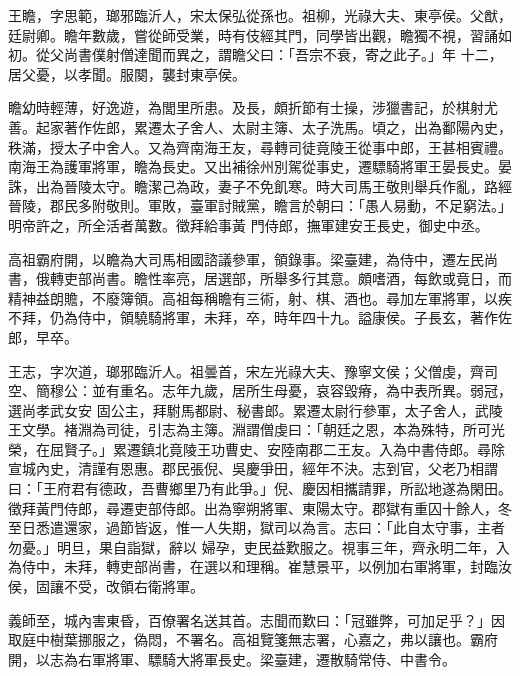 
\begin{pinyinscope}

 王瞻，字思範，瑯邪臨沂人，宋太保弘從孫也。祖柳，光祿大夫、東亭侯。父猷，廷尉卿。瞻年數歲，嘗從師受業，時有伎經其門，同學皆出觀，瞻獨不視，習誦如初。從父尚書僕射僧達聞而異之，謂瞻父曰：「吾宗不衰，寄之此子。」年
 十二，居父憂，以孝聞。服闋，襲封東亭侯。



 瞻幼時輕薄，好逸遊，為閭里所患。及長，頗折節有士操，涉獵書記，於棋射尤善。起家著作佐郎，累遷太子舍人、太尉主簿、太子洗馬。頃之，出為鄱陽內史，秩滿，授太子中舍人。又為齊南海王友，尋轉司徒竟陵王從事中郎，王甚相賓禮。南海王為護軍將軍，瞻為長史。又出補徐州別駕從事史，遷驃騎將軍王晏長史。晏誅，出為晉陵太守。瞻潔己為政，妻子不免飢寒。時大司馬王敬則舉兵作亂，路經晉陵，郡民多附敬則。軍敗，臺軍討賊黨，瞻言於朝曰：「愚人易動，不足窮法。」明帝許之，所全活者萬數。徵拜給事黃
 門侍郎，撫軍建安王長史，御史中丞。



 高祖霸府開，以瞻為大司馬相國諮議參軍，領錄事。梁臺建，為侍中，遷左民尚書，俄轉吏部尚書。瞻性率亮，居選部，所舉多行其意。頗嗜酒，每飲或竟日，而精神益朗贍，不廢簿領。高祖每稱瞻有三術，射、棋、酒也。尋加左軍將軍，以疾不拜，仍為侍中，領驍騎將軍，未拜，卒，時年四十九。謚康侯。子長玄，著作佐郎，早卒。



 王志，字次道，瑯邪臨沂人。祖曇首，宋左光祿大夫、豫寧文侯；父僧虔，齊司空、簡穆公：並有重名。志年九歲，居所生母憂，哀容毀瘠，為中表所異。弱冠，選尚孝武女安
 固公主，拜駙馬都尉、秘書郎。累遷太尉行參軍，太子舍人，武陵王文學。褚淵為司徒，引志為主簿。淵謂僧虔曰：「朝廷之恩，本為殊特，所可光榮，在屈賢子。」累遷鎮北竟陵王功曹史、安陸南郡二王友。入為中書侍郎。尋除宣城內史，清謹有恩惠。郡民張倪、吳慶爭田，經年不決。志到官，父老乃相謂曰：「王府君有德政，吾曹鄉里乃有此爭。」倪、慶因相攜請罪，所訟地遂為閑田。徵拜黃門侍郎，尋遷吏部侍郎。出為寧朔將軍、東陽太守。郡獄有重囚十餘人，冬至日悉遣還家，過節皆返，惟一人失期，獄司以為言。志曰：「此自太守事，主者勿憂。」明旦，果自詣獄，辭以
 婦孕，吏民益歎服之。視事三年，齊永明二年，入為侍中，未拜，轉吏部尚書，在選以和理稱。崔慧景平，以例加右軍將軍，封臨汝侯，固讓不受，改領右衛將軍。



 義師至，城內害東昏，百僚署名送其首。志聞而歎曰：「冠雖弊，可加足乎？」因取庭中樹葉挪服之，偽悶，不署名。高祖覽箋無志署，心嘉之，弗以讓也。霸府開，以志為右軍將軍、驃騎大將軍長史。梁臺建，遷散騎常侍、中書令。




\end{pinyinscope}
